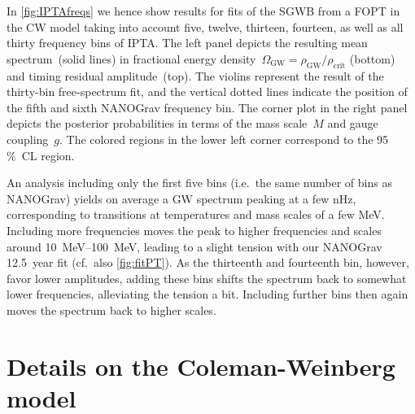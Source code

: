 \documentclass{article}
\newcommand*{\GW}{\ensuremath{\mathrm{GW}}\xspace}
\begin{document}
In \cref{fig:IPTAfreqs} we hence show results for fits of the SGWB from a FOPT in the CW model taking into account five, twelve, thirteen, fourteen, as well as all thirty frequency bins of IPTA. 
The left panel depicts the resulting mean spectrum~(solid lines) in fractional energy density~$\Omega_\GW = \rho_\GW/\rho_\mathrm{crit}$ (bottom) and timing residual amplitude~(top).
The violins represent the result of the thirty-bin free-spectrum fit, and the vertical dotted lines indicate the position of the fifth and sixth NANOGrav frequency bin.
The corner plot in the right panel depicts the posterior probabilities in terms of the mass scale~$M$ and gauge coupling~$g$. 
The colored regions in the lower left corner correspond to the 95\,\%~CL region.

An analysis including only the first five bins (i.e.\ the same number of bins as NANOGrav) yields on average a GW spectrum peaking at a few \si{\nano\Hz}, corresponding to transitions at temperatures and mass scales of a few \si{\MeV}. 
Including more frequencies moves the peak to higher frequencies and scales around \SIrange{10}{100}{\MeV}, leading to a slight tension with our NANOGrav 12.5~year fit (cf.\ also \cref{fig:fitPT}).
As the thirteenth and fourteenth bin, however, favor lower amplitudes, adding these bins shifts the spectrum back to somewhat lower frequencies, alleviating the tension a bit.
Including further bins then again moves the spectrum back to higher scales. 

\section{Details on the Coleman-Weinberg model}
\label{app:CW_details}
\end{document}
